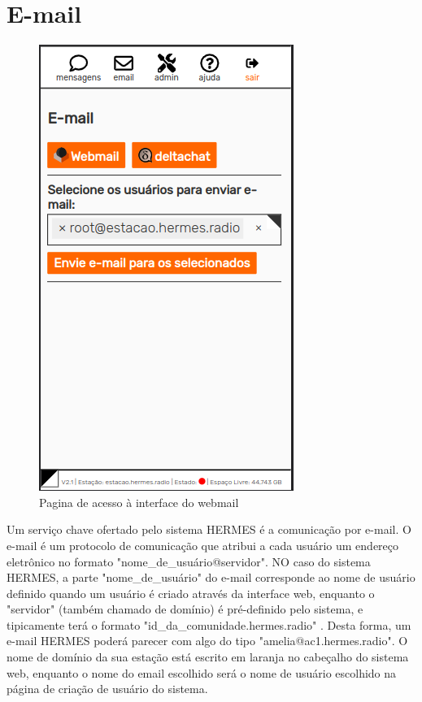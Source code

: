 \documentclass[11pt,a4paper]{article}
\begin{document}
\section{E-mail}
\label{email}

\begin{figure}[H]
    \centering
    \includegraphics[width=0.5\columnwidth]{screenshots/frontend/pt_kn/email.png}
    	\caption{Pagina de acesso à interface do webmail}
	\vspace{-10pt}
    \label{fig:webmail2}
\end{figure}

Um serviço chave ofertado pelo sistema HERMES é a comunicação por e-mail. O e-mail é um protocolo de comunicação que atribui a cada usuário um endereço eletrônico no formato "nome\_de\_usuário@servidor". NO caso do sistema HERMES, a parte "nome\_de\_usuário" do e-mail corresponde ao nome de usuário definido quando um usuário é criado através da interface web, enquanto o "servidor" (também chamado de domínio) é pré-definido pelo sistema, e tipicamente terá o formato "id\_da\_comunidade.hermes.radio" . Desta forma, um e-mail HERMES poderá parecer com algo do tipo "amelia@ac1.hermes.radio". O nome de domínio da sua estação está escrito em laranja no cabeçalho do sistema web, enquanto o nome do email escolhido será o nome de usuário escolhido na página de criação de usuário do sistema. 

\end{document}
